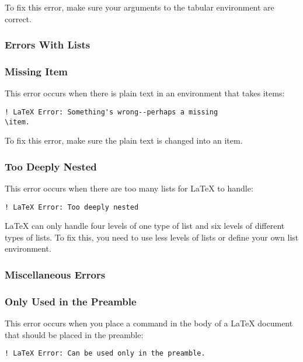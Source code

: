 To fix this error, make sure your arguments to the tabular environment
are correct.

\subsubsection{Errors With Lists}
\label{sec:errors-with-lists}

\subsubsection{Missing Item}
\label{sec:missing-item}

This error occurs when there is plain text in an environment that
takes items:
\begin{verbatim}
! LaTeX Error: Something's wrong--perhaps a missing
\item.
\end{verbatim}

To fix this error, make sure the plain text is changed into an item.

\subsubsection{Too Deeply Nested}
\label{sec:too-deeply-nested}

This error occurs when there are too many lists for \LaTeX{} to
handle:
\begin{verbatim}
! LaTeX Error: Too deeply nested
\end{verbatim}

\LaTeX{} can only handle four levels of one type of list and six
levels of different types of lists.  To fix this, you need to use less
levels of lists or define your own list environment.

\subsubsection{Miscellaneous Errors}
\label{sec:miscellaneous-errors}

\subsubsection{Only Used in the Preamble}
\label{sec:only-used-preamble}

This error occurs when you place a command in the body of a \LaTeX{}
document that should be placed in the preamble:
\begin{verbatim}
! LaTeX Error: Can be used only in the preamble.
\end{verbatim}

